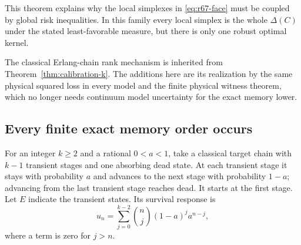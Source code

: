 This theorem explains why the local simplexes in \eqref{eq:r67-face} must be coupled by global risk inequalities. In this family every local simplex is the whole $\Delta(C)$ under the stated least-favorable measure, but there is only one robust optimal kernel.

The classical Erlang-chain rank mechanism is inherited from Theorem~\ref{thm:calibration-k}. The additions here are its realization by the same physical squared loss in every model and the finite physical witness theorem, which no longer needs continuum model uncertainty for the exact memory lower.

\subsection{Every finite exact memory order occurs}
For an integer $k\ge2$ and a rational $0<a<1$, take a classical target chain with $k-1$ transient stages and one absorbing dead state. At each transient stage it stays with probability $a$ and advances to the next stage with probability $1-a$; advancing from the last transient stage reaches dead. It starts at the first stage. Let $E$ indicate the transient states. Its survival response is
\begin{equation}\label{eq:r67-erlang-response}
 u_n=\sum_{j=0}^{k-2}\binom nj(1-a)^j a^{n-j},
\end{equation}
where a term is zero for $j>n$.

